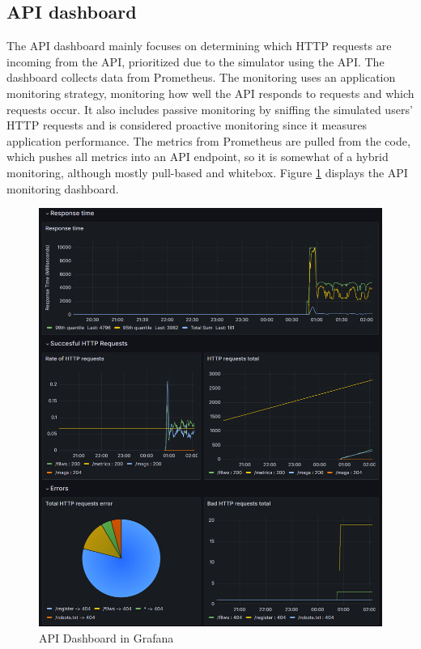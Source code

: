 \documentclass[12pt, a4paper, oneside]{book}
\begin{document}
\subsection{API dashboard}
The API dashboard mainly focuses on determining which HTTP requests are incoming from the API, prioritized due to the simulator using the API.
The dashboard collects data from Prometheus.
The monitoring uses an application monitoring strategy, monitoring how well the API responds to requests and which requests occur.
It also includes passive monitoring by sniffing the simulated users' HTTP requests and is considered proactive monitoring since it measures application performance.
The metrics from Prometheus are pulled from the code, which pushes all metrics into an API endpoint, so it is somewhat of a hybrid monitoring, although mostly pull-based and whitebox.
Figure \ref{fig:api-dashboard} displays the API monitoring dashboard.

\begin{figure}[H]
    \centering
    \includegraphics[width=0.7\linewidth]{images/api-dashboard.png}
    \caption{API Dashboard in Grafana}
    \label{fig:api-dashboard}
\end{figure}
\end{document}
